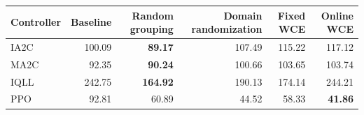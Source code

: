 \begin{tabular}{lrrrrr}
\hline
Controller & Baseline & Random grouping & Domain randomization & Fixed WCE & Online WCE \\
\hline
IA2C & 100.09 & \textbf{89.17} & 107.49 & 115.22 & 117.12 \\
MA2C & 92.35 & \textbf{90.24} & 100.66 & 103.65 & 103.74 \\
IQLL & 242.75 & \textbf{164.92} & 190.13 & 174.14 & 244.21 \\
PPO & 92.81 & 60.89 & 44.52 & 58.33 & \textbf{41.86} \\
\hline
\end{tabular}
